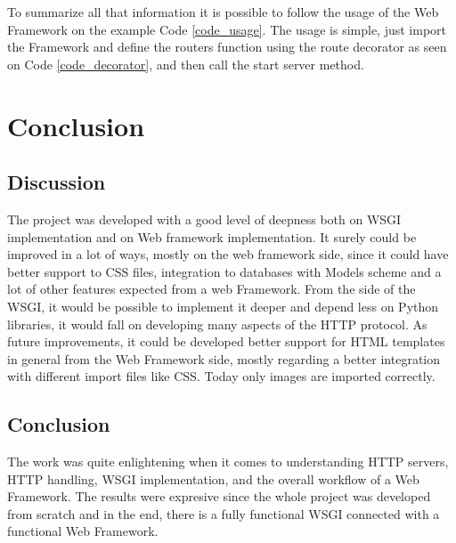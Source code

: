\documentclass[journal,12pt,onecolumn,draftclsnofoot,]{IEEEtran}
\begin{document}
To summarize all that information it is possible to follow the usage of the Web Framework on the example Code \ref{code_usage}. The usage is simple, just import the Framework and define the routers function using the route decorator as seen on Code \ref{code_decorator}, and then call the start server method.








\section{Conclusion}

\subsection{Discussion}
 The project was developed with a good level of deepness both on WSGI implementation and on Web framework implementation. It surely could be improved in a lot of ways, mostly on the web framework side, since it could have better support to CSS files, integration to databases with Models scheme and a lot of other features expected from a web Framework. From the side of the WSGI, it would be possible to implement it deeper and depend less on Python libraries, it would fall on developing many aspects of the HTTP protocol.
 As future improvements, it could be developed better support for HTML templates in general from the Web Framework side, mostly regarding a better integration with different import files like CSS. Today only images are imported correctly.
\subsection{Conclusion}
The work was quite enlightening when it comes to understanding HTTP servers, HTTP handling, WSGI implementation, and the overall workflow of a Web Framework. The results were expresive since the whole project was developed from scratch and in the end, there is a fully functional WSGI connected with a functional Web Framework.


\printbibliography

\vfill
\end{document}
